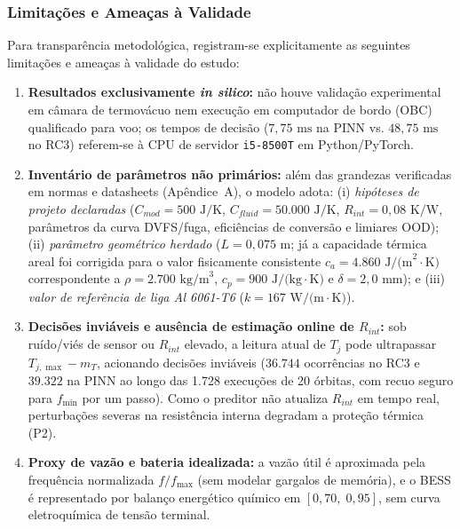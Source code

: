 \subsubsection{Limitações e Ameaças à Validade}

Para transparência metodológica, registram-se explicitamente as seguintes limitações e ameaças à validade do estudo:
\begin{enumerate}
    \item \textbf{Resultados exclusivamente \textit{in silico}:} não houve validação experimental em câmara de termovácuo nem execução em computador de bordo (OBC) qualificado para voo; os tempos de decisão ($7{,}75\text{ ms}$ na PINN vs. $48{,}75\text{ ms}$ no RC3) referem-se à CPU de servidor \texttt{i5-8500T} em Python/PyTorch.
    \item \textbf{Inventário de parâmetros não primários:} além das grandezas verificadas em normas e datasheets (Apêndice~A), o modelo adota: (i) \textit{hipóteses de projeto declaradas} ($C_{mod} = 500\text{ J/K}$, $C_{fluid} = 50.000\text{ J/K}$, $R_{int} = 0{,}08\text{ K/W}$, parâmetros da curva DVFS/fuga, eficiências de conversão e limiares OOD); (ii) \textit{parâmetro geométrico herdado} ($L = 0{,}075\text{ m}$; já a capacidade térmica areal foi corrigida para o valor fisicamente consistente $c_a = 4.860\text{ J/(m}^2\cdot\text{K)}$ correspondente a $\rho = 2.700\text{ kg/m}^3$, $c_p = 900\text{ J/(kg}\cdot\text{K)}$ e $\delta = 2{,}0\text{ mm}$); e (iii) \textit{valor de referência de liga Al 6061-T6} ($k = 167\text{ W/(m}\cdot\text{K)}$).
    \item \textbf{Decisões inviáveis e ausência de estimação online de $R_{int}$:} sob ruído/viés de sensor ou $R_{int}$ elevado, a leitura atual de $T_j$ pode ultrapassar $T_{j,\max} - m_T$, acionando decisões inviáveis ($36.744$ ocorrências no RC3 e $39.322$ na PINN ao longo das 1.728 execuções de 20 órbitas, com recuo seguro para $f_{\min}$ por um passo). Como o preditor não atualiza $R_{int}$ em tempo real, perturbações severas na resistência interna degradam a proteção térmica (P2).
    \item \textbf{Proxy de vazão e bateria idealizada:} a vazão útil é aproximada pela frequência normalizada $f/f_{\max}$ (sem modelar gargalos de memória), e o BESS é representado por balanço energético químico em $[0{,}70,\; 0{,}95]$, sem curva eletroquímica de tensão terminal.
\end{enumerate}
